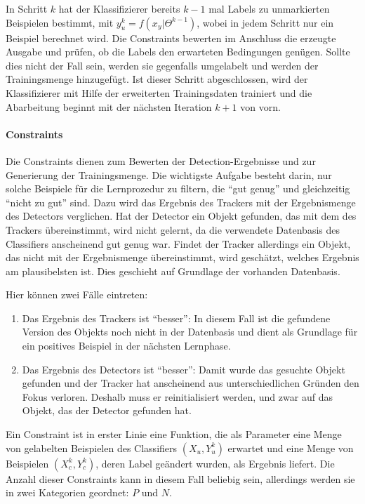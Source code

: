 In Schritt $k$ hat der Klassifizierer bereits $k-1$ mal Labels zu unmarkierten Beispielen bestimmt, mit $y_{u}^{k}=f(x_{y}|\Theta^{k-1})$, wobei in jedem Schritt nur ein Beispiel berechnet wird. Die Constraints bewerten im Anschluss die erzeugte Ausgabe und prüfen, ob die Labels den erwarteten Bedingungen genügen. Sollte dies nicht der Fall sein, werden sie gegenfalls umgelabelt und werden der Trainingsmenge hinzugefügt. Ist dieser Schritt abgeschlossen, wird der Klassifizierer mit Hilfe der erweiterten Trainingsdaten trainiert und die Abarbeitung beginnt mit der nächsten Iteration $k+1$ von vorn.

\paragraph{Constraints}
Die Constraints dienen zum Bewerten der Detection-Ergebnisse und zur Generierung der Trainingsmenge. Die wichtigste Aufgabe besteht darin, nur solche Beispiele für die Lernprozedur zu filtern, die ``gut genug'' und gleichzeitig ``nicht zu gut'' sind. Dazu wird das Ergebnis des Trackers mit der Ergebnismenge des Detectors verglichen. Hat der Detector ein Objekt gefunden, das mit dem des Trackers übereinstimmt, wird nicht gelernt, da die verwendete Datenbasis des Classifiers anscheinend gut genug war. Findet der Tracker allerdings ein Objekt, das nicht mit der Ergebnismenge übereinstimmt, wird geschätzt, welches Ergebnis am plausibelsten ist. Dies geschieht auf Grundlage der vorhanden Datenbasis.

Hier können zwei Fälle eintreten:
\begin{enumerate}
\item Das Ergebnis des Trackers ist ``besser'': In diesem Fall ist die gefundene Version des Objekts noch nicht in der Datenbasis und dient als Grundlage für ein positives Beispiel in der nächsten Lernphase.
\item Das Ergebnis des Detectors ist ``besser'': Damit wurde das gesuchte Objekt gefunden und der Tracker hat anscheinend aus unterschiedlichen Gründen den Fokus verloren. Deshalb muss er reinitialisiert werden, und zwar auf das Objekt, das der Detector gefunden hat.
\end{enumerate} 

Ein Constraint ist in erster Linie eine Funktion, die als Parameter eine Menge von gelabelten Beispielen des Classifiers $(X_{u},Y_{u}^{k})$ erwartet und eine Menge von Beispielen $(X_{c}^{k},Y_{c}^{k})$, deren Label geändert wurden, als Ergebnis liefert. Die Anzahl dieser Constraints kann in diesem Fall beliebig sein, allerdings werden sie in zwei Kategorien geordnet: $P$ und $N$. 

